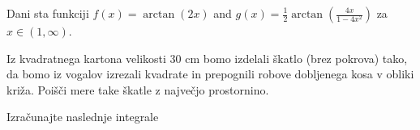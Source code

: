 \documentclass[11pt,a4paper]{exam}
\renewcommand{\{}{\lbrace}
\renewcommand{\}}{\rbrace}
\begin{document}
\begin{questions}
	\question Dani sta funkciji $f(x)=\arctan (2x)$ and $g(x)=\frac{1}{2} \arctan \left( \frac{4x}{1-4x^{2}} \right)$ za $x \in (1,\infty)$. 
		
		\vspace{1cm}
	\question Iz kvadratnega kartona velikosti $30$ cm bomo izdelali škatlo (brez pokrova) tako, da bomo iz vogalov izrezali kvadrate in prepognili robove dobljenega kosa v obliki križa. Poišči mere take škatle z največjo prostornino.
	
	\vspace{1cm}
	\question Izračunajte naslednje integrale
\end{questions}
\end{document}

